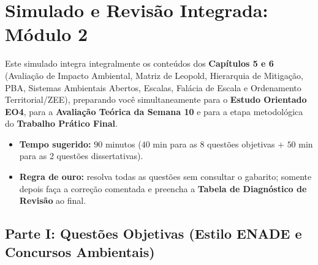 
\clearpage
{}
{}
\chapter*{Simulado e Revisão Integrada: Módulo 2}

\begin{boxConceito}
  Este simulado integra integralmente os conteúdos dos \textbf{Capítulos 5 e 6} (Avaliação de Impacto Ambiental, Matriz de Leopold, Hierarquia de Mitigação, PBA, Sistemas Ambientais Abertos, Escalas, Falácia de Escala e Ordenamento Territorial/ZEE), preparando você simultaneamente para o \textbf{Estudo Orientado EO4}, para a \textbf{Avaliação Teórica da Semana 10} e para a etapa metodológica do \textbf{Trabalho Prático Final}.
  \begin{itemize}[leftmargin=1.5em, itemsep=2pt]
    \item \textbf{Tempo sugerido:} $90$ minutos ($40$ min para as 8 questões objetivas + $50$ min para as 2 questões dissertativas).
    \item \textbf{Regra de ouro:} resolva todas as questões sem consultar o gabarito; somente depois faça a correção comentada e preencha a \textbf{Tabela de Diagnóstico de Revisão} ao final.
  \end{itemize}
\end{boxConceito}

\section*{Parte I: Questões Objetivas (Estilo ENADE e Concursos Ambientais)}

